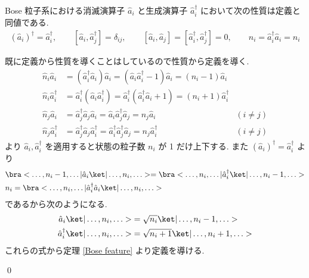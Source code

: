 \documentclass[uplatex,dvipdfmx,a4paper,11pt]{jlreq}
\makeatletter
\numberwithin{equation}{section}
\theoremstyle{definition}
\renewenvironment{proof}[1][\proofname]{\par
  \normalfont
  \topsep6\p@\@plus6\p@ \trivlist
  \item[\hskip\labelsep{\bfseries #1}\@addpunct{\bfseries}]\ignorespaces\quad\par
}{
  \qed\endtrivlist\@endpefalse
}
\renewcommand\proofname{証明}
\makeatother
\begin{document}
\begin{theorem}[Q21-41]
  Bose 粒子系における消滅演算子 $\hat{a}_i$ と生成演算子 $\hat{a}_i^\dagger$ において次の性質は定義と同値である.
  \begin{align}
    (\hat{a}_i)^\dagger = \hat{a}_i^\dagger, \qquad [\hat{a}_i, \hat{a}_j^\dagger] = \delta_{ij}, \qquad [\hat{a}_i, \hat{a}_j] = [\hat{a}_i^\dagger, \hat{a}_j^\dagger] = 0, \qquad \hat{n}_i = \hat{a}_i^\dagger\hat{a}_i = n_i
  \end{align}
\end{theorem}
\begin{proof}
  既に定義から性質を導くことはしているので性質から定義を導く.
  \begin{align}
    \hat{n}_i\hat{a}_i         & = (\hat{a}_i^\dagger\hat{a}_i)\hat{a}_i = (\hat{a}_i\hat{a}_i^\dagger - 1)\hat{a}_i = (n_i - 1)\hat{a}_i                                     \\
    \hat{n}_i\hat{a}_i^\dagger & = \hat{a}_i^\dagger(\hat{a}_i\hat{a}_i^\dagger) = \hat{a}_i^\dagger(\hat{a}_i^\dagger\hat{a}_i + 1) = (n_i + 1)\hat{a}_i^\dagger             \\
    \hat{n}_j\hat{a}_i         & = \hat{a}_j^\dagger\hat{a}_j\hat{a}_i = \hat{a}_i\hat{a}_j^\dagger\hat{a}_j = n_j\hat{a}_i                                       & (i\neq j) \\
    \hat{n}_j\hat{a}_i^\dagger & = \hat{a}_j^\dagger\hat{a}_j\hat{a}_i^\dagger = \hat{a}_i^\dagger\hat{a}_j^\dagger\hat{a}_j = n_j\hat{a}_i^\dagger               & (i\neq j)
  \end{align}
  より $\hat{a}_i, \hat{a}_i^\dagger$ を適用すると状態の粒子数 $n_i$ が 1 だけ上下する. また $(\hat{a}_i)^\dagger = \hat{a}_i^\dagger$ より
  \begin{align}
     & \bra<\ldots,n_i-1,\ldots|\hat{a}_i\ket|\ldots,n_i,\ldots> = \bra<\ldots,n_i,\ldots|\hat{a}_i^\dagger\ket|\ldots,n_i-1,\ldots> \\
     & n_i = \bra<\ldots,n_i,\ldots|\hat{a}_i^\dagger\hat{a}_i\ket|\ldots,n_i,\ldots>
  \end{align}
  であるから次のようになる.
  \begin{align}
    \hat{a}_i\ket|\ldots,n_i,\ldots>         & = \sqrt{n_i}\ket|\ldots,n_i-1,\ldots>     \\
    \hat{a}_i^\dagger\ket|\ldots,n_i,\ldots> & = \sqrt{n_i + 1}\ket|\ldots,n_i+1,\ldots>
  \end{align}
  これらの式から定理 \ref{Bose feature} より定義を導ける.
\end{proof}
\end{document}
